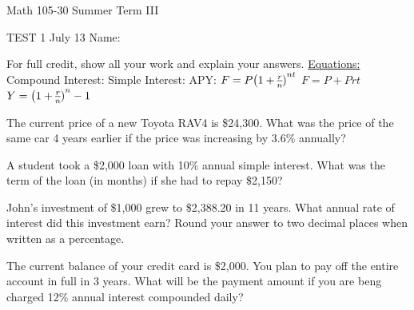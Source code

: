 \documentclass[11pt,epsfig]{article}
\begin{document}
Math 105-30 Summer Term III 

TEST 1 July 13 \hspace{1.9in} {Name:} {\underline {\hspace{3.5in}}}
\vspace{2pc}

For full credit, show all your work and explain your answers.
\newline
\newline
\underline{Equations:}
\newline
Compound Interest: \hspace{2.5cm}  Simple Interest:   \hspace{2.5cm} APY:
\newline
$F=P\big{(1+\frac{r}{n})}^{nt}$ 
\hspace{3.5cm} $F=P+Prt$
\hspace{3.0cm} $Y=\big{(1+\frac{r}{n})}^{n}-1$

\vspace{2pc}

\begin{problem}{12}
The current price of a new Toyota RAV4 is \$24,300. What was the price of the same car 4 years earlier if the price was increasing by 3.6\% annually? 
\vfill
\end{problem}

\begin{problem}{12}
A student took a \$2,000 loan with 10\% annual simple interest. What was the term of the loan (in months) if she had to repay \$2,150?
\vfill
\end{problem}

\newpage

\begin{problem}{12}
John's investment of \$1,000 grew to \$2,388.20 in 11 years. What annual rate of interest did this investment earn? Round your answer to two decimal places when written as a percentage.

\vfill
\end{problem}


\begin{problem}{13}
The current balance of your credit card is \$2,000. You plan to pay off the entire account in full in 3 years. What will be the payment amount if you are beng charged 12\% annual interest compounded daily?

\vfill
\end{problem}
\end{document}
